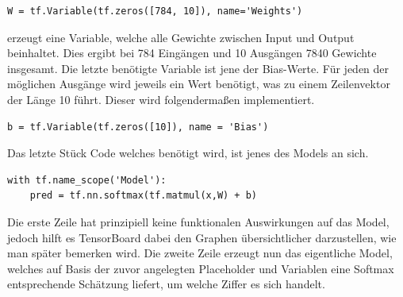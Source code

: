 \lstset{language=Python}

\begin{lstlisting}
W = tf.Variable(tf.zeros([784, 10]), name='Weights')
\end{lstlisting}

erzeugt eine Variable, welche alle Gewichte zwischen Input und Output beinhaltet. Dies ergibt bei 784 Eingängen und 10 Ausgängen 7840 Gewichte insgesamt. Die letzte benötigte Variable ist jene der Bias-Werte. Für jeden der möglichen Ausgänge wird jeweils ein Wert benötigt, was zu einem Zeilenvektor der Länge 10 führt. Dieser wird folgendermaßen implementiert.


\lstset{language=Python}

\begin{lstlisting}
b = tf.Variable(tf.zeros([10]), name = 'Bias')
\end{lstlisting}



Das letzte Stück Code welches benötigt wird, ist jenes des Models an sich.


\lstset{language=Python}
   
\begin{lstlisting}
with tf.name_scope('Model'):
    pred = tf.nn.softmax(tf.matmul(x,W) + b)
\end{lstlisting}
    
    
Die erste Zeile hat prinzipiell keine funktionalen Auswirkungen auf das Model, jedoch hilft es TensorBoard dabei den Graphen übersichtlicher darzustellen, wie man später bemerken wird.
Die zweite Zeile erzeugt nun das eigentliche Model, welches auf Basis der zuvor angelegten Placeholder und Variablen eine Softmax entsprechende Schätzung liefert, um welche Ziffer es sich handelt.





\label{cha:Model}

